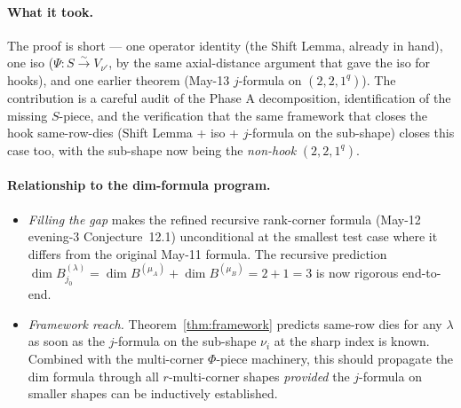 \documentclass[11pt]{article}
\theoremstyle{definition}
\begin{document}
\paragraph{What it took.} The proof is short --- one operator
identity (the Shift Lemma, already in hand), one iso
($\Psi: S \xrightarrow{\sim} V_{\nu'}$, by the same axial-distance
argument that gave the iso for hooks), and one earlier theorem
(May-13 $j$-formula on $(2, 2, 1^q)$). The contribution is a careful
audit of the Phase A decomposition, identification of the missing
$S$-piece, and the verification that the same framework that closes
the hook same-row-dies (Shift Lemma + iso + $j$-formula on the
sub-shape) closes this case too, with the sub-shape now being the
\emph{non-hook} $(2, 2, 1^q)$.

\paragraph{Relationship to the dim-formula program.}
\begin{itemize}[leftmargin=2em,topsep=0.2em,itemsep=0.1em]
\item \emph{Filling the gap} makes the refined recursive
rank-corner formula (May-12 evening-3 Conjecture~12.1) unconditional
at the smallest test case where it differs from the original May-11
formula. The recursive prediction $\dim B^{(\lambda)}_{j_0} =
\dim B^{(\mu_A)} + \dim B^{(\mu_B)} = 2 + 1 = 3$ is now rigorous
end-to-end.
\item \emph{Framework reach.} Theorem~\ref{thm:framework} predicts
same-row dies for any $\lambda$ as soon as the $j$-formula on the
sub-shape $\nu_i$ at the sharp index is known. Combined with the
multi-corner $\Phi$-piece machinery, this should propagate the dim
formula through all $r$-multi-corner shapes \emph{provided} the
$j$-formula on smaller shapes can be inductively established.
\end{itemize}
\end{document}
